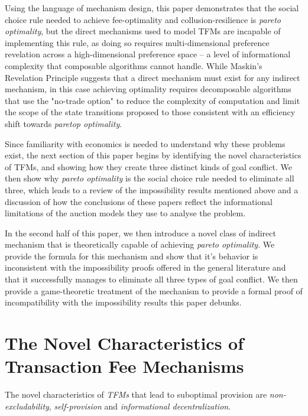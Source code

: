 \documentclass[sigconf,anonymous]{aamas}
\begin{document}
Using the language of mechanism design, this paper demonstrates that the social choice rule needed to achieve fee-optimality and collusion-resilience is \textit{pareto optimality}, but the direct mechanisms used to model TFMs are incapable of implementing this rule, as doing so requires multi-dimensional preference revelation across a high-dimensional preference space -- a level of informational complexity that composable algorithms cannot handle. While Maskin's Revelation Principle suggests that a direct mechanism must exist for any indirect mechanism, in this case achieving optimality requires decomposable algorithms that use the "no-trade option" to reduce the complexity of computation and limit the scope of the state transitions proposed to those consistent with an efficiency shift towards \textit{paretop optimality}.

Since familiarity with economics is needed to understand why these problems exist, the next section of this paper begins by identifying the novel characteristics of TFMs, and showing how they create three distinct kinds of goal conflict. We then show why \textit{pareto optimality} is the social choice rule needed to eliminate all three, which leads to a review of the impossibility results mentioned above and a discussion of how the conclusions of these papers reflect the informational limitations of the auction models they use to analyse the problem.

In the second half of this paper, we then introduce a novel class of indirect mechanism that is theoretically capable of achieving \textit{pareto optimality}. We provide the formula for this mechanism and show that it's behavior is inconsistent with the impossibility proofs offered in the general literature and that it successfully manages to eliminate all three types of goal conflict. We then provide a game-theoretic treatment of the mechanism to provide a formal proof of incompatibility with the impossibility results this paper debunks.


\section{The Novel Characteristics of Transaction Fee Mechanisms\label{sec::section1p1}}

The novel characteristics of \textit{TFMs} that lead to suboptimal provision are \emph{non-excludability}, \emph{self-provision} and \emph{informational decentralization}. 
\end{document}
